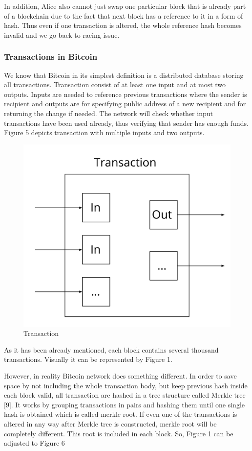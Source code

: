 \documentclass[conference,compsoc]{IEEEtran}
\begin{document}
In addition, Alice also cannot just swap one particular block that is already part of a blockchain due to the fact that next block has a reference to it in a form of hash. 
Thus even if one transaction is altered, the whole reference hash becomes invalid and we go back to racing issue.

\subsubsection{Transactions in Bitcoin}
We know that Bitcoin in its simplest definition is a distributed database storing all transactions. 
Transaction consist of at least one input and at most two outputs.
Inputs are needed to reference previous transactions where the sender is recipient and outputs are for specifying public address of a new recipient and for returning the change if needed.
The network will check whether input transactions have been used already, thus verifying that sender has enough funds.
Figure 5 depicts transaction with multiple inputs and two outputs.

\begin{figure}[h]
  \centering
  \includegraphics[width=.45\textwidth]{graphics/tx.png}
  \caption{Transaction}
  \label{fig:fig5}
\end{figure}

As it has been already mentioned, each block contains several thousand transactions. 
Visually it can be represented by Figure 1. 

However, in reality Bitcoin network does something different. 
In order to save space by not including the whole transaction body, but keep previous hash inside each block valid, all transaction are hashed in a tree structure called Merkle tree [9].
It works by grouping transactions in pairs and hashing them until one single hash is obtained which is called merkle root. 
If even one of the transactions is altered in any way after Merkle tree is constructed, merkle root will be completely different. 
This root is included in each block.
So, Figure 1 can be adjusted to Figure 6
\end{document}
